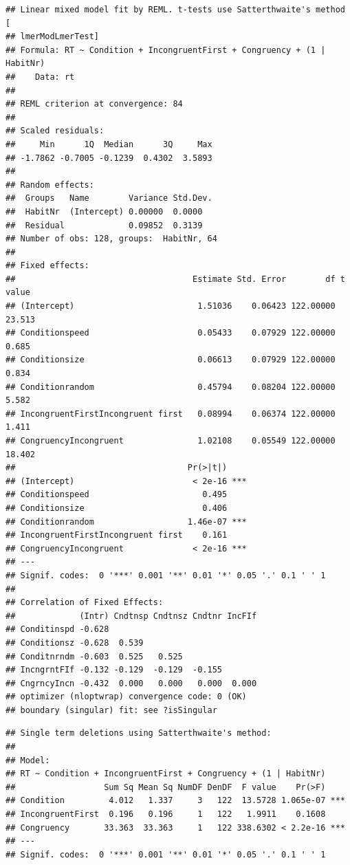 \documentclass[
]{book}
\begin{document}
\begin{verbatim}
## Linear mixed model fit by REML. t-tests use Satterthwaite's method [
## lmerModLmerTest]
## Formula: RT ~ Condition + IncongruentFirst + Congruency + (1 | HabitNr)
##    Data: rt
## 
## REML criterion at convergence: 84
## 
## Scaled residuals: 
##     Min      1Q  Median      3Q     Max 
## -1.7862 -0.7005 -0.1239  0.4302  3.5893 
## 
## Random effects:
##  Groups   Name        Variance Std.Dev.
##  HabitNr  (Intercept) 0.00000  0.0000  
##  Residual             0.09852  0.3139  
## Number of obs: 128, groups:  HabitNr, 64
## 
## Fixed effects:
##                                    Estimate Std. Error        df t value
## (Intercept)                         1.51036    0.06423 122.00000  23.513
## Conditionspeed                      0.05433    0.07929 122.00000   0.685
## Conditionsize                       0.06613    0.07929 122.00000   0.834
## Conditionrandom                     0.45794    0.08204 122.00000   5.582
## IncongruentFirstIncongruent first   0.08994    0.06374 122.00000   1.411
## CongruencyIncongruent               1.02108    0.05549 122.00000  18.402
##                                   Pr(>|t|)    
## (Intercept)                        < 2e-16 ***
## Conditionspeed                       0.495    
## Conditionsize                        0.406    
## Conditionrandom                   1.46e-07 ***
## IncongruentFirstIncongruent first    0.161    
## CongruencyIncongruent              < 2e-16 ***
## ---
## Signif. codes:  0 '***' 0.001 '**' 0.01 '*' 0.05 '.' 0.1 ' ' 1
## 
## Correlation of Fixed Effects:
##             (Intr) Cndtnsp Cndtnsz Cndtnr IncFIf
## Conditinspd -0.628                              
## Conditionsz -0.628  0.539                       
## Conditnrndm -0.603  0.525   0.525               
## IncngrntFIf -0.132 -0.129  -0.129  -0.155       
## CngrncyIncn -0.432  0.000   0.000   0.000  0.000
## optimizer (nloptwrap) convergence code: 0 (OK)
## boundary (singular) fit: see ?isSingular
\end{verbatim}

\begin{verbatim}
## Single term deletions using Satterthwaite's method:
## 
## Model:
## RT ~ Condition + IncongruentFirst + Congruency + (1 | HabitNr)
##                  Sum Sq Mean Sq NumDF DenDF  F value    Pr(>F)    
## Condition         4.012   1.337     3   122  13.5728 1.065e-07 ***
## IncongruentFirst  0.196   0.196     1   122   1.9911    0.1608    
## Congruency       33.363  33.363     1   122 338.6302 < 2.2e-16 ***
## ---
## Signif. codes:  0 '***' 0.001 '**' 0.01 '*' 0.05 '.' 0.1 ' ' 1
\end{verbatim}
\end{document}
